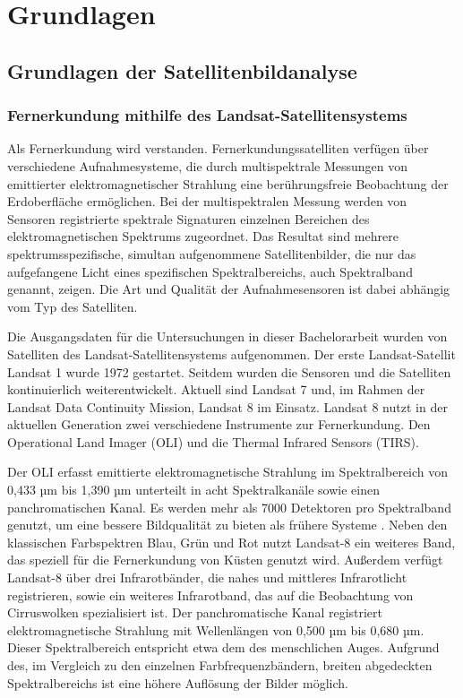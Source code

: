 
\chapter{Grundlagen}
\section{Grundlagen der Satellitenbildanalyse}
\subsection{Fernerkundung mithilfe des Landsat-Satellitensystems}

Als Fernerkundung wird  verstanden. Fernerkundungssatelliten verfügen über verschiedene Aufnahmesysteme, die durch multispektrale Messungen von emittierter elektromagnetischer Strahlung eine berührungsfreie Beobachtung der Erdoberfläche ermöglichen. Bei der multispektralen Messung werden von Sensoren registrierte spektrale Signaturen einzelnen Bereichen des elektromagnetischen Spektrums zugeordnet. Das Resultat sind mehrere spektrumsspezifische, simultan aufgenommene Satellitenbilder, die nur das aufgefangene Licht eines spezifischen Spektralbereichs, auch Spektralband genannt, zeigen. Die Art und Qualität der Aufnahmesensoren ist dabei abhängig vom Typ des Satelliten. 

Die Ausgangsdaten für die Untersuchungen in dieser Bachelorarbeit wurden von Satelliten des Landsat-Satellitensystems aufgenommen. Der erste Landsat-Satellit Landsat 1 wurde 1972 gestartet. Seitdem wurden die Sensoren und die Satelliten kontinuierlich weiterentwickelt. Aktuell sind Landsat 7 und, im Rahmen der Landsat Data Continuity Mission, Landsat 8 im Einsatz. Landsat 8 nutzt in der aktuellen Generation zwei verschiedene Instrumente zur Fernerkundung. Den Operational Land Imager (OLI) und die Thermal Infrared Sensors (TIRS). 

Der OLI erfasst emittierte elektromagnetische Strahlung im Spektralbereich von 0,433 µm bis 1,390 µm unterteilt in acht Spektralkanäle sowie einen panchromatischen Kanal. Es werden mehr als 7000 Detektoren pro Spektralband genutzt, um eine bessere Bildqualität zu bieten als frühere Systeme \cite{Markham2004}. Neben den klassischen Farbspektren Blau, Grün und Rot nutzt Landsat-8 ein weiteres Band, das speziell für die Fernerkundung von Küsten genutzt wird. Außerdem verfügt Landsat-8 über drei Infrarotbänder, die nahes und mittleres Infrarotlicht registrieren, sowie ein weiteres Infrarotband, das auf die Beobachtung von Cirruswolken spezialisiert ist. Der panchromatische Kanal registriert elektromagnetische Strahlung mit Wellenlängen von 0,500 µm bis 0,680 µm. Dieser Spektralbereich entspricht etwa dem des menschlichen Auges. Aufgrund des, im Vergleich zu den einzelnen Farbfrequenzbändern, breiten abgedeckten Spektralbereichs ist eine höhere Auflösung der Bilder möglich.

